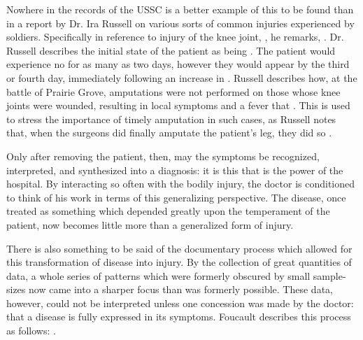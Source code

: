 \documentclass[12pt]{article}
\begin{document}
Nowhere in the records of the USSC is a better example of this to be found than in a report by Dr. Ira Russell on various sorts of common injuries experienced by soldiers. Specifically in
reference to injury of the knee joint, , he remarks, . Dr. Russell
describes the initial state of the patient as being . The patient would experience no
 for as many as two days, however they would appear by the third or fourth day, immediately following an increase in
. Russell describes how, at the battle of Prairie Grove, amputations were not performed on those whose knee joints were
wounded, resulting in  local symptoms and a fever that . This is used to stress the importance of timely
amputation in such cases, as Russell notes that, when the surgeons did finally amputate the patient's leg, they did so .\autocite[All quoted portions of this paragraph appear in][33]{ussc:2:194}

Only after removing the patient, then, may the symptoms be recognized, interpreted, and synthesized into a diagnosis: it is this that is the power of the hospital.
By interacting so often with the bodily injury, the doctor is conditioned to think of his work in terms of this generalizing perspective. The disease, once
treated as something which depended greatly upon the temperament of the patient, now becomes little more than a generalized form of injury.

There is also something to be said of the documentary process which allowed for this transformation of disease into injury. By the collection of great quantities
of data, a whole series of patterns which were formerly obscured by small sample-sizes now came into a sharper focus than was formerly possible. These data, however,
could not be interpreted unless one concession was made by the doctor: that a disease is fully expressed in its symptoms. Foucault describes this process as follows:
\autocite[95]{Foucault1994}.
\end{document}
